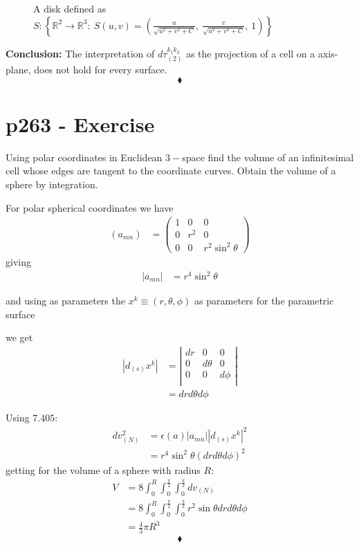 \begin{figure}[H]%
    \centering
    
\caption{A disk defined as $S: \left\{\mathbb{R}^2\rightarrow \mathbb{R}^3: \ S(u,v)= \left(\frac{u}{\sqrt{u^2+v^2+C}},\ \frac{v}{\sqrt{u^2+v^2+C}}, \ 1\right)\right\}$}
\label{fig:fig_p257}
\end{figure}
\textbf{Conclusion:} The interpretation of  $d\tau_{(2)}^{k_1k_2}$ as the projection of a cell on a axis-plane, does not hold for every surface.
$$\blacklozenge$$
\newpage




\section{p263 - Exercise}
\begin{tcolorbox}
Using polar coordinates in Euclidean $3-$space find the volume of an infinitesimal cell whose edges are tangent to the coordinate curves. Obtain the volume of a sphere by integration.
\end{tcolorbox}
For polar spherical coordinates we have
\begin{align*}
\left(a_{mn}\right)&= \left(\begin{array}{lll}
1&0&0\\
0&r^2&0\\
0&0&r^2\sin^2\theta
\end{array}\right)
\end{align*}
giving
\begin{align*}
\left|a_{mn}\right| &= r^4\sin^2\theta
\end{align*}

and using as parameters the $x^k \equiv(r,\theta,\phi)$ as parameters for the parametric surface

we get 
\begin{align*}
\left|d_{(s)}x^k\right| &= \left|\begin{array}{lll}
dr&0&0\\
0&d\theta&0\\
0&0&d\phi\\
\end{array}\right|\\
&= drd\theta d\phi
\end{align*}

Using $\mathbf{7.405}$:
\begin{align*}
dv_{(N)}^2&= \epsilon (a)\left|a_{mn}\right|\left|d_{(s)}x^k\right|^2\\
&= r^4\sin^2\theta\left( drd\theta d\phi\right)^2
\end{align*}
getting for the volume of a sphere with radius $R$:
\begin{align*}
V&=8 \int_{0}^{R}\int_{0}^{\frac{\pi}{2}}\int_{0}^{\frac{\pi}{2}}dv_{(N)}\\
&= 8 \int_{0}^{R}\int_{0}^{\frac{\pi}{2}}\int_{0}^{\frac{\pi}{2}}r^2\sin\theta dr d\theta d\phi\\
&= \frac{4}{3}\pi R^3
\end{align*}
$$\blacklozenge$$
\newpage




